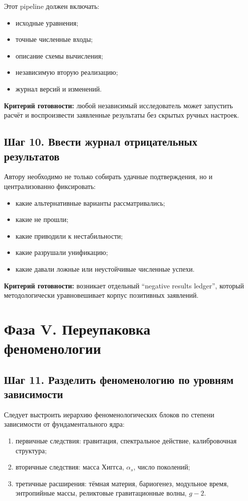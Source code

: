 \documentclass[12pt,a4paper]{article}
\begin{document}
Этот pipeline должен включать:
\begin{itemize}
    \item исходные уравнения;
    \item точные численные входы;
    \item описание схемы вычисления;
    \item независимую вторую реализацию;
    \item журнал версий и изменений.
\end{itemize}

\textbf{Критерий готовности:} любой независимый исследователь может запустить расчёт и воспроизвести заявленные результаты без скрытых ручных настроек.

\subsection{Шаг 10. Ввести журнал отрицательных результатов}

Автору необходимо не только собирать удачные подтверждения, но и централизованно фиксировать:
\begin{itemize}
    \item какие альтернативные варианты рассматривались;
    \item какие не прошли;
    \item какие приводили к нестабильности;
    \item какие разрушали унификацию;
    \item какие давали ложные или неустойчивые численные успехи.
\end{itemize}

\textbf{Критерий готовности:} возникает отдельный ``negative results ledger'', который методологически уравновешивает корпус позитивных заявлений.

\section{Фаза V. Переупаковка феноменологии}

\subsection{Шаг 11. Разделить феноменологию по уровням зависимости}

Следует выстроить иерархию феноменологических блоков по степени зависимости от фундаментального ядра:
\begin{enumerate}
    \item первичные следствия: гравитация, спектральное действие, калибровочная структура;
    \item вторичные следствия: масса Хиггса, \(\alpha_s\), число поколений;
    \item третичные расширения: тёмная материя, бариогенез, модульное время, энтропийные массы, реликтовые гравитационные волны, \(g-2\).
\end{enumerate}
\end{document}
